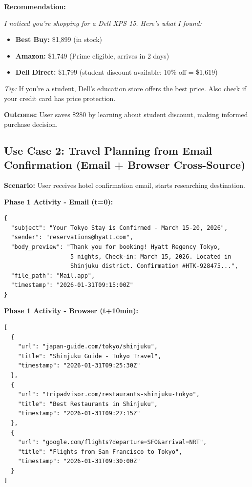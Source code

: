 \documentclass[11pt,a4paper]{article}
\begin{document}
\textbf{Recommendation:}
\begin{tcolorbox}[colback=green!5,colframe=green!80]
\textit{I noticed you're shopping for a Dell XPS 15. Here's what I found:}
\begin{itemize}
    \item \textbf{Best Buy:} \$1,899 (in stock)
    \item \textbf{Amazon:} \$1,749 (Prime eligible, arrives in 2 days)
    \item \textbf{Dell Direct:} \$1,799 (student discount available: 10\% off = \$1,619)
\end{itemize}
\textit{Tip:} If you're a student, Dell's education store offers the best price. Also check if your credit card has price protection.
\end{tcolorbox}

\textbf{Outcome:} User saves \$280 by learning about student discount, making informed purchase decision.

\subsection{Use Case 2: Travel Planning from Email Confirmation (Email + Browser Cross-Source)}

\textbf{Scenario:} User receives hotel confirmation email, starts researching destination.

\textbf{Phase 1 Activity - Email (t=0):}
\begin{tcolorbox}[colback=gray!5,colframe=gray!80,title=Email Log]
\begin{verbatim}
{
  "subject": "Your Tokyo Stay is Confirmed - March 15-20, 2026",
  "sender": "reservations@hyatt.com",
  "body_preview": "Thank you for booking! Hyatt Regency Tokyo, 
                   5 nights, Check-in: March 15, 2026. Located in 
                   Shinjuku district. Confirmation #HTK-928475...",
  "file_path": "Mail.app",
  "timestamp": "2026-01-31T09:15:00Z"
}
\end{verbatim}
\end{tcolorbox}

\textbf{Phase 1 Activity - Browser (t+10min):}
\begin{tcolorbox}[colback=gray!5,colframe=gray!80,title=Browser Logs]
\begin{verbatim}
[
  {
    "url": "japan-guide.com/tokyo/shinjuku",
    "title": "Shinjuku Guide - Tokyo Travel",
    "timestamp": "2026-01-31T09:25:30Z"
  },
  {
    "url": "tripadvisor.com/restaurants-shinjuku-tokyo",
    "title": "Best Restaurants in Shinjuku",
    "timestamp": "2026-01-31T09:27:15Z"
  },
  {
    "url": "google.com/flights?departure=SFO&arrival=NRT",
    "title": "Flights from San Francisco to Tokyo",
    "timestamp": "2026-01-31T09:30:00Z"
  }
]
\end{verbatim}
\end{tcolorbox}
\end{document}
